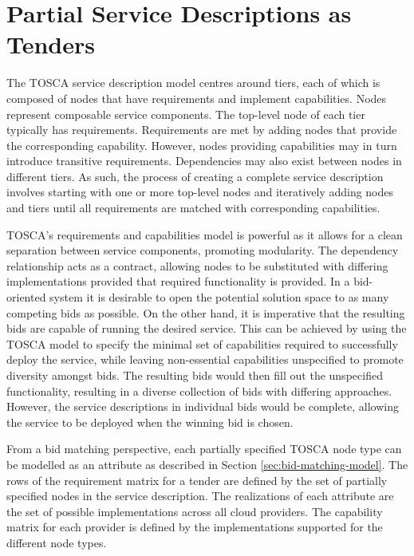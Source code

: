 \documentclass[10pt, conference, compsocconf]{IEEEtran}
\begin{document}
\section{Partial Service Descriptions as Tenders}
\label{sec:partial-descriptions}

The TOSCA service description model centres around tiers, each of which is composed of nodes that have requirements and implement capabilities. Nodes represent composable service components. The top-level node of each tier typically has requirements. Requirements are met by adding nodes that provide the corresponding capability. However, nodes providing capabilities may in turn introduce transitive requirements. Dependencies may also exist between nodes in different tiers. As such, the process of creating a complete service description involves starting with one or more top-level nodes and iteratively adding nodes and tiers until all requirements are matched with corresponding capabilities.

TOSCA's requirements and capabilities model is powerful as it allows for a clean separation between service components, promoting modularity. The dependency relationship acts as a contract, allowing nodes to be substituted with differing implementations provided that required functionality is provided. In a bid-oriented system it is desirable to open the potential solution space to as many competing bids as possible. On the other hand, it is imperative that the resulting bids are capable of running the desired service. This can be achieved by using the TOSCA model to specify the minimal set of capabilities required to successfully deploy the service, while leaving non-essential capabilities unspecified to promote diversity amongst bids. The resulting bids would then fill out the unspecified functionality, resulting in a diverse collection of bids with differing approaches. However, the service descriptions in individual bids would be complete, allowing the service to be deployed when the winning bid is chosen.

From a bid matching perspective, each partially specified TOSCA node type can be modelled as an attribute  as described in Section \ref{sec:bid-matching-model}. The rows of the requirement matrix  for a tender are defined by the set of partially specified nodes in the service description. The realizations  of each attribute are the set of possible implementations across all cloud providers. The capability matrix  for each provider is defined by the implementations supported for the different node types.
\end{document}
